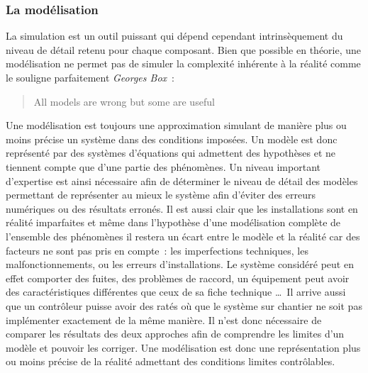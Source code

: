\subsubsection{La modélisation} %
\label{ssub:la_modelisation}
La simulation est un outil puissant qui dépend cependant intrinsèquement du niveau de
détail retenu pour chaque composant. Bien que possible en théorie, une modélisation ne
permet pas de simuler la complexité inhérente à la réalité comme le souligne parfaitement
\textit{Georges Box}~:
\blockquote{All models are wrong but some are useful}
Une modélisation est toujours une approximation simulant de manière plus ou moins précise
un système dans des conditions imposées. Un modèle est donc représenté par des systèmes
d’équations qui admettent des hypothèses et ne tiennent compte que d’une partie des
phénomènes. Un niveau important d’expertise est ainsi nécessaire afin de déterminer le
niveau de détail des modèles permettant de représenter au mieux le système afin d’éviter
des erreurs numériques ou des résultats erronés. Il est aussi clair que les installations
sont en réalité imparfaites et même dans l’hypothèse d’une modélisation complète de
l’ensemble des phénomènes il restera un écart entre le modèle et la réalité car des
facteurs ne sont pas pris en compte~: les imperfections techniques, les
malfonctionnements, ou les erreurs d’installations. Le système considéré peut en effet
comporter des fuites, des problèmes de raccord, un équipement peut avoir des
caractéristiques différentes que ceux de sa fiche technique
\dots\ Il arrive aussi que un contrôleur puisse avoir des ratés où que le système sur chantier ne
soit pas implémenter exactement de la même manière. Il n’est donc nécessaire de comparer
les résultats des deux approches afin de comprendre les limites d’un modèle et pouvoir les
corriger. Une modélisation est donc une représentation plus ou moins précise de la réalité
admettant des conditions limites contrôlables.


